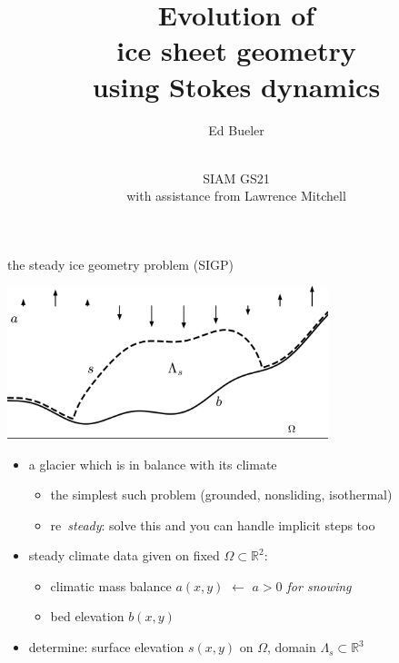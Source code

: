 \documentclass{beamer}
\title{Evolution of \\ ice sheet geometry \\ using Stokes dynamics}
\author{Ed Bueler}
\date{\phantom{foo} \bigskip \bigskip \bigskip \\ SIAM GS21 \\ with assistance from Lawrence Mitchell}
\newcommand{\RR}{\mathbb{R}}
\begin{document}
\begin{frame}
	\maketitle
\end{frame}


\begin{frame}{the steady ice geometry problem (SIGP)}

\vspace{-2mm}
\begin{center}
\includegraphics[width=0.7\textwidth]{figs/stokesdomain.png}
\end{center}

\vspace{-1mm}
\begin{itemize}
\item a glacier which is in balance with its climate
    \begin{itemize}
    \item the simplest such problem (grounded, nonsliding, isothermal)
    \item re~\emph{steady}: solve this and you can handle implicit steps too
    \end{itemize}
\item steady climate data given on fixed $\Omega \subset \RR^2$:
    \begin{itemize}
    \item climatic mass balance $a(x,y)$ \hfill $\gets$ \emph{$a>0$ for snowing}
    \item bed elevation $b(x,y)$
    \end{itemize}
\item determine: surface elevation $s(x,y)$ on $\Omega$, domain $\Lambda_s \subset \RR^3$
\end{itemize}
\end{frame}
\end{document}
